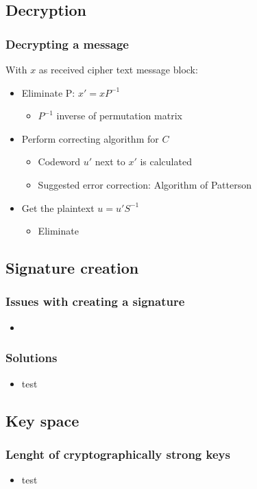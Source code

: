 	\subsection{Decryption}
		\begin{frame}
			\frametitle{Decrypting a message}
			With $x$ as received cipher text message block:
			\begin{itemize}
				\item Eliminate P: $x' = xP^{-1}$ 
				\begin{itemize}
					\item $P^{-1}$ inverse of permutation matrix
				\end{itemize}
				\item Perform correcting algorithm for $C$ 
				\begin{itemize}
					\item Codeword $u'$ next to $x'$ is calculated
					\item Suggested error correction: Algorithm of Patterson
				\end{itemize}
				\item Get the plaintext $u = u'S^{-1}$
				\begin{itemize}
					\item Eliminate 
				\end{itemize}
				
			\end{itemize}
	
		\end{frame}
	
	\subsection{Signature creation}
		\begin{frame}
			\frametitle{Issues with creating a signature}
			\begin{itemize}
				\item 
			\end{itemize}
		\end{frame}
		
		\begin{frame}
			\frametitle{Solutions}
			\begin{itemize}
				\item test
			\end{itemize}
		\end{frame}
		
\subsection{Key space}
		\begin{frame}
			\frametitle{Lenght of cryptographically strong keys}
			\begin{itemize}
				\item test
			\end{itemize}
		\end{frame}

